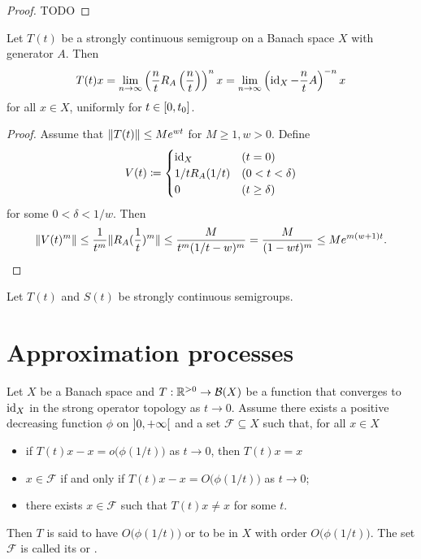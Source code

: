 \begin{proof}
TODO
\end{proof}
\begin{corollary}
Let $T(t)$ be a strongly continuous semigroup on a Banach space $X$ with generator $A$. Then
\[ T(t)x = \lim_{n\to\infty}\left(\frac{n}{t} R_{A}\left(\frac{n}{t}\right)\right)^nx = \lim_{n\to\infty}\left(\operatorname{id}_X - \frac{n}{t} A\right)^{-n}x \]
for all $x\in X$, uniformly for $t\in\interval{0,t_0}$.
\end{corollary}
\begin{proof}
Assume that $\lVert T(t)\rVert\leq Me^{wt}$ for $M\geq 1, w> 0$. Define
\[ V(t) \coloneqq \begin{cases}
\operatorname{id}_X & (t=0) \\
1/t R_A(1/t) & (0<t<\delta) \\
0 & (t\geq \delta)
\end{cases} \]
for some $0<\delta<1/w$. Then
\[ \lVert V(t)^m\rVert \leq \frac{1}{t^m}\lVert R_A(\frac{1}{t})^m\rVert \leq \frac{M}{t^m (1/t - w)^m} = \frac{M}{(1-wt)^m} \leq Me^{m(w+1)t}. \]
\end{proof}
\begin{corollary}
Let $T(t)$ and $S(t)$ be strongly continuous semigroups.
\end{corollary}

\section{Approximation processes}
\begin{definition}
Let $X$ be a Banach space and $T: \mathbb{R}^{> 0}\to \operatorname{\mathcal{B}}(X)$ be a function that converges to $\operatorname{id}_X$ in the strong operator topology as $t\to 0$. Assume there exists a positive decreasing function $\phi$ on $\interval[o]{0,+\infty}$ and a set $\mathcal{F}\subseteq X$ such that, for all $x\in X$
\begin{itemize}
\item if $T(t)x - x = o\big(\phi(1/t)\big)$ as $t\to 0$, then $T(t)x = x$
\item $x\in \mathcal{F}$ \textup{if and only if} $T(t)x-x = O\big(\phi(1/t)\big)$ as $t\to 0$;
\item there exists $x\in \mathcal{F}$ such that $T(t)x \neq x$ for some $t$.
\end{itemize}
Then $T$ is said to have  $O\big(\phi(1/t)\big)$ or to be  in $X$ with order $O\big(\phi(1/t)\big)$. The set $\mathcal{F}$ is called its  or .
\end{definition}

